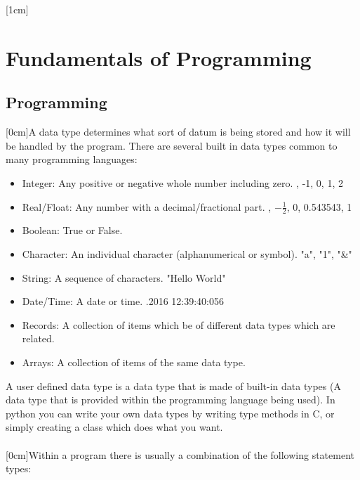 \documentclass[a4paper]{article}
\begin{document}
	[1cm]
	\section{Fundamentals of Programming}
		\subsection{Programming}
			[0cm]A data type determines what sort of datum is being stored and how it will be handled by the program. There are several built in data types common to many programming languages:
			\begin{itemize}
				\setlength\itemsep{0em}
				\item Integer: Any positive or negative whole number including zero.
					, -1, 0, 1, 2
				\item Real/Float: Any number with a decimal/fractional part.
					, $ -\frac{1}{2} $, 0, 0.543543, 1
				\item Boolean: True or False.
				\item Character: An individual character (alphanumerical or symbol).
					\subitem "a", "1", "\&"
				\item String: A sequence of characters.
					\subitem "Hello World"
				\item Date/Time: A date or time.
					.2016 12:39:40:056
				\item Records: A collection of items which be of different data types which are related.
				\item Arrays: A collection of items of the same data type.
			\end{itemize}
			A user defined data type is a data type that is made of built-in data types (A data type that is provided within the programming language being used). In python you can write your own data types by writing type methods in C, or simply creating a class which does what you want. \\ \\
			[0cm]Within a program there is usually a combination of the following statement types:
\end{document}
